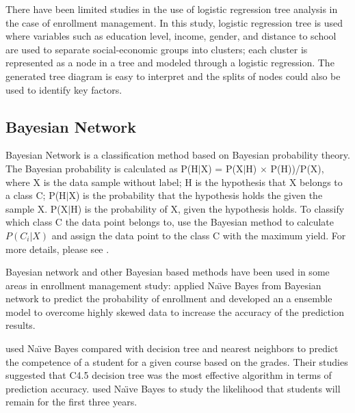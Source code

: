 \documentclass[12pt,english]{report}
\begin{document}
There have been limited studies in the use of logistic regression tree analysis in the case of enrollment management. In this study, logistic regression tree is used where variables such as education level, income, gender, and distance to school are used to separate  social-economic groups into clusters; each cluster is represented as a node in a tree and modeled through a logistic regression. The generated tree diagram is easy to interpret and the splits of nodes could also be used to identify key factors.

\subsection {Bayesian Network}
Bayesian Network is a classification method based on Bayesian probability theory.
The Bayesian probability is calculated as P(H$|$X) = P(X$|$H)  $\times$ P(H))/P(X), where X is the data sample without label; H is the hypothesis that X belongs to a class C; P(H$|$X) is the probability that the hypothesis holds the given the sample X.
P(X$|$H) is the probability of X, given the hypothesis holds. 
To classify which class C the data point belongs to, use the Bayesian method to calculate $P(C_i|X)$ and assign the data point to the class C with the maximum yield.
For more details, please see \citep{han2011data}.


Bayesian network and other Bayesian based methods have been used in some areas in enrollment management study: 
\citet{optimization_bayesian} applied Na{\"\i}ve Bayes from Bayesian network to predict the probability of enrollment and developed an  a ensemble model to overcome highly skewed data to increase the accuracy of the prediction results.

\citet{dt_enroll_academic} used Na{\"\i}ve Bayes compared with decision tree and nearest neighbors to predict the competence of a student for a given course based on the grades. Their studies suggested that C4.5 decision tree was  the most effective algorithm in terms of prediction accuracy.
\citet{nandeshwarlearning2011} used Na{\"\i}ve Bayes to study the likelihood that students will remain for the first three years.
\end{document}
